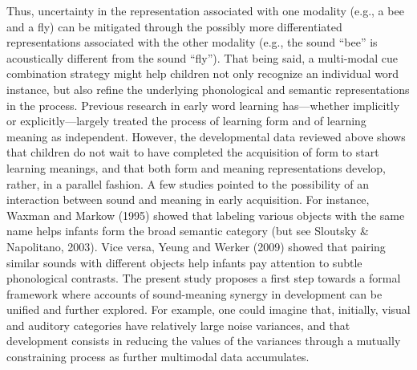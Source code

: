 \documentclass[english,floatsintext,man]{apa6}
\theoremstyle{definition}
\theoremstyle{definition}
\theoremstyle{definition}
\theoremstyle{remark}
\begin{document}
Thus, uncertainty in the representation associated with one modality
(e.g., a bee and a fly) can be mitigated through the possibly more
differentiated representations associated with the other modality (e.g.,
the sound \enquote{bee} is acoustically different from the sound
\enquote{fly}). That being said, a multi-modal cue combination strategy
might help children not only recognize an individual word instance, but
also refine the underlying phonological and semantic representations in
the process. Previous research in early word learning has---whether
implicitly or explicitly---largely treated the process of learning form
and of learning meaning as independent. However, the developmental data
reviewed above shows that children do not wait to have completed the
acquisition of form to start learning meanings, and that both form and
meaning representations develop, rather, in a parallel fashion. A few
studies pointed to the possibility of an interaction between sound and
meaning in early acquisition. For instance, Waxman and Markow (1995)
showed that labeling various objects with the same name helps infants
form the broad semantic category (but see Sloutsky \& Napolitano, 2003).
Vice versa, Yeung and Werker (2009) showed that pairing similar sounds
with different objects help infants pay attention to subtle phonological
contrasts. The present study proposes a first step towards a formal
framework where accounts of sound-meaning synergy in development can be
unified and further explored. For example, one could imagine that,
initially, visual and auditory categories have relatively large noise
variances, and that development consists in reducing the values of the
variances through a mutually constraining process as further multimodal
data accumulates.
\end{document}
